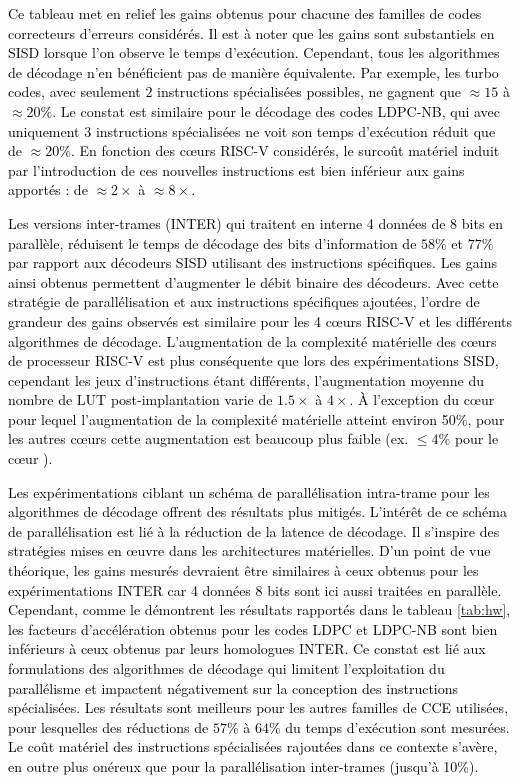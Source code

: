 \documentclass[../main.tex]{subfiles}
\begin{document}

\textcolor{black}{Ce tableau met en relief les gains obtenus pour chacune des familles de codes correcteurs d'erreurs considérés. 
Il est à noter que les gains sont substantiels en SISD lorsque l'on observe le temps d'exécution. 
Cependant, tous les algorithmes de décodage n'en bénéficient pas de manière équivalente. 
Par exemple, les turbo codes, avec seulement $2$ instructions spécialisées possibles, ne gagnent que $\approx 15$ à $\approx 20\%$. 
Le constat est similaire pour le décodage des codes LDPC-NB, qui avec uniquement $3$ instructions spécialisées ne voit son temps d'exécution réduit que de $\approx 20\%$. 
En fonction des cœurs RISC-V considérés, le surcoût matériel induit par l'introduction de ces nouvelles instructions est bien inférieur aux gains apportés : de $\approx2\times$ à $\approx8\times$.}

\textcolor{black}{Les versions inter-trames (INTER) qui traitent en interne 4 données de 8 bits en parallèle, réduisent le temps de décodage des bits d'information de $58\%$ et $77\%$ par rapport aux décodeurs SISD utilisant des instructions spécifiques. 
Les gains ainsi obtenus permettent d'augmenter le débit binaire des décodeurs. 
Avec cette stratégie de parallélisation et aux instructions spécifiques ajoutées, l'ordre de grandeur des gains observés est similaire pour les 4 cœurs RISC-V et les différents algorithmes de décodage. 
L'augmentation de la complexité matérielle des cœurs de processeur RISC-V est plus conséquente que lors des expérimentations SISD, cependant les jeux d'instructions étant différents, l'augmentation moyenne du nombre de LUT post-implantation varie de $1.5\times$ à $4\times$. 
À l'exception du cœur \PicoRV\space pour lequel l'augmentation de la complexité matérielle atteint environ 50\%, pour les autres cœurs cette augmentation est beaucoup plus faible (ex. $\leq 4\%$ pour le cœur \RISCY).}

\textcolor{black}{Les expérimentations ciblant un schéma de parallélisation intra-trame pour les algorithmes de décodage offrent des résultats plus mitigés. 
L'intérêt de ce schéma de parallélisation est lié à la réduction de la latence de décodage. 
Il s'inspire des stratégies mises en œuvre dans les architectures matérielles. 
D'un point de vue théorique, les gains mesurés devraient être similaires à ceux obtenus pour les expérimentations INTER car 4 données 8 bits sont ici aussi traitées en parallèle. 
Cependant, comme le démontrent les résultats rapportés dans le tableau \ref{tab:hw}, les facteurs d'accélération obtenus pour les codes LDPC et LDPC-NB sont bien inférieurs à ceux obtenus par leurs homologues INTER. 
Ce constat est lié aux formulations des algorithmes de décodage qui limitent l'exploitation du parallélisme et impactent négativement sur la conception des instructions spécialisées. 
Les résultats sont meilleurs pour les autres familles de CCE utilisées, pour lesquelles des réductions de $57\%$ à $64\%$ du temps d'exécution sont mesurées. 
Le coût matériel des instructions spécialisées rajoutées dans ce contexte s'avère, en outre plus onéreux que pour la parallélisation inter-trames (jusqu'à 10\%).}
\end{document}
